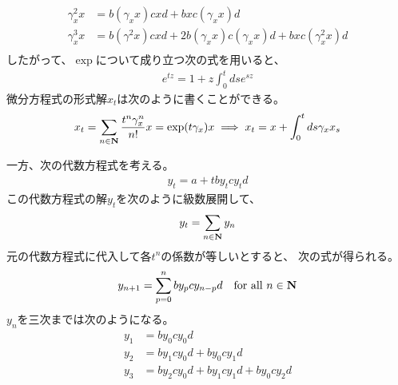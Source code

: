 {\begin{note}[テイラー展開]
\begin{equation*}
\begin{split}
			\gamma_x^2x &= b(\gamma_xx)cxd + bxc(\gamma_xx)d \\
			\gamma_x^3x &= b(\gamma^2 x)cxd + 2b(\gamma_xx)c(\gamma_xx)d 
				+ bxc(\gamma_x^2x)d \\
		\end{split}\end{equation*}
		したがって、$\exp$について成り立つ次の式を用いると、
		\begin{equation*}\begin{split}
			e^{tz} = 1 + z\int_0^tds e^{sz}
		\end{split}\end{equation*}
		微分方程式の形式解$x_t$は次のように書くことができる。
		\begin{equation*}\begin{split}
			x_t = \sum_{n\in\mathbf{N}} \frac{t^n\gamma_x^n}{n!}x
			= \exp(t\gamma_x)x \implies x_t = x + \int_0^tds \gamma_xx_s
		\end{split}\end{equation*}

		一方、次の代数方程式を考える。
		\begin{equation*}\begin{split}
			y_t = a + tby_tcy_td
		\end{split}\end{equation*}
		この代数方程式の解$y_t$を次のように級数展開して、
		\begin{equation*}\begin{split}
			y_t = \sum_{n\in\mathbf{N}} y_n
		\end{split}\end{equation*}
		元の代数方程式に代入して各$t^n$の係数が等しいとすると、
		次の式が得られる。
		\begin{equation*}\begin{split}
			y_{n+1} = \sum_{p=0}^n by_pcy_{n-p}d \quad\text{for all } n\in\mathbf{N}
		\end{split}\end{equation*}
		$y_n$を三次までは次のようになる。
		\begin{equation*}\begin{split}
			y_1 &= by_0cy_0d \\
			y_2 &= by_1cy_0d + by_0cy_1d \\
			y_3 &= by_2cy_0d + by_1cy_1d + by_0cy_2d \\
		\end{split}\end{equation*}


\end{note}}
